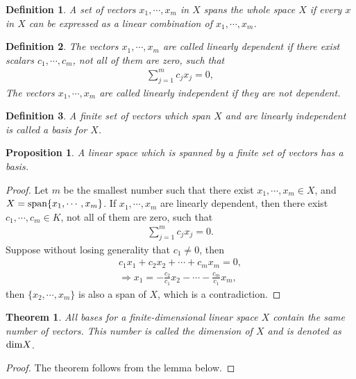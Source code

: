 \documentclass[11pt]{book}
\newtheorem{definition}{Definition}[chapter]
\newtheorem{theorem}{Theorem}[chapter]
\newtheorem{proposition}{Proposition}[chapter]
\theoremstyle{definition}
\numberwithin{equation}{chapter}
\begin{document}
\begin{definition}
A set of vectors $x_1,\cdots, x_m$ in $X$ spans the whole space $X$ if every $x$ in $X$ can be expressed as a linear combination of $x_1,\cdots, x_m$.
\end{definition}

\begin{definition}
The vectors $x_1,\cdots, x_m$ are called linearly dependent if there exist scalars $c_1,\cdots, c_m$, not all of them are zero, such that
\begin{align*}
    \sum^m_{j=1} c_j x_j = 0,
\end{align*}
The vectors $x_1,\cdots, x_m$ are called linearly independent if they are not dependent. 
\end{definition}

\medskip

\begin{definition}
A finite set of vectors which span $X$ and are linearly independent is called a basis for $X$.
\end{definition}

\medskip

\begin{proposition}
A linear space which is spanned by a finite set of vectors has a basis.
\end{proposition}
\begin{proof}
Let $m$ be the smallest number such that there exist $x_1,\cdots,x_m \in X$, and $X = {\rm span}\{x_1,\cdots,x_m\}$. If $x_1,\cdots,x_m$ are linearly dependent, then there exist $c_1,\cdots,c_m\in K$, not all of them are zero, such that
\begin{align*}
    \sum^m_{j=1}c_j x_j = 0.
\end{align*}
Suppose without losing generality that $c_1 \neq 0$, then 
\begin{align*}
    c_1 x_1 + c_2 x_2 + \cdots + c_m x_m = 0,\\
    \Rightarrow x_1 = -\frac{c_2}{c_1}x_2 - \cdots - \frac{c_m}{c_1}x_m,
\end{align*}
then $\{x_2,\cdots,x_m\}$ is also a span of $X$, which is a contradiction.
\end{proof}

\medskip

\begin{theorem}
All bases for a finite-dimensional linear space $X$ contain the
same number of vectors. This number is called the dimension of $X$ and is denoted as ${\rm dim} X$.
\end{theorem}
\begin{proof}
The theorem follows from the lemma below.
\end{proof}
\end{document}
